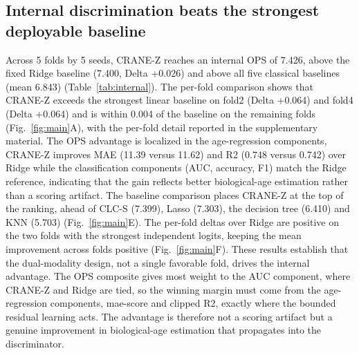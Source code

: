 \documentclass[unnumsec,webpdf,contemporary,large]{oup-authoring-template}
\begin{document}
\subsection{Internal discrimination beats the strongest deployable baseline}\label{sec:res1}
Across 5 folds by 5 seeds, CRANE-Z reaches an internal OPS of 7.426, above the fixed Ridge baseline (7.400, Delta +0.026) and above all five classical baselines (mean 6.843) (Table~\ref{tab:internal}). The per-fold comparison shows that CRANE-Z exceeds the strongest linear baseline on fold2 (Delta +0.064) and fold4 (Delta +0.064) and is within 0.004 of the baseline on the remaining folds (Fig.~\ref{fig:main}A), with the per-fold detail reported in the supplementary material. The OPS advantage is localized in the age-regression components, CRANE-Z improves MAE (11.39 versus 11.62) and R2 (0.748 versus 0.742) over Ridge while the classification components (AUC, accuracy, F1) match the Ridge reference, indicating that the gain reflects better biological-age estimation rather than a scoring artifact. The baseline comparison places CRANE-Z at the top of the ranking, ahead of CLC-S (7.399), Lasso (7.303), the decision tree (6.410) and KNN (5.703) (Fig.~\ref{fig:main}E). The per-fold deltas over Ridge are positive on the two folds with the strongest independent logits, keeping the mean improvement across folds positive (Fig.~\ref{fig:main}F). These results establish that the dual-modality design, not a single favorable fold, drives the internal advantage. The OPS composite gives most weight to the AUC component, where CRANE-Z and Ridge are tied, so the winning margin must come from the age-regression components, mae-score and clipped R2, exactly where the bounded residual learning acts. The advantage is therefore not a scoring artifact but a genuine improvement in biological-age estimation that propagates into the discriminator.
\end{document}
